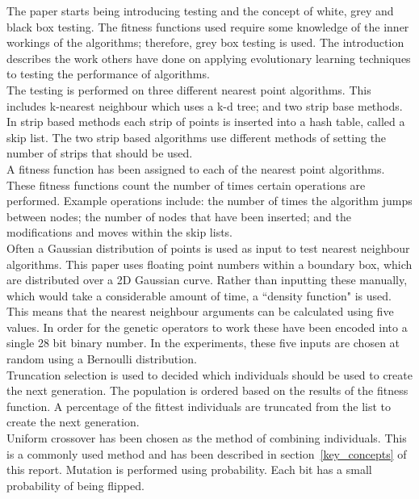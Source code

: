 \documentclass[10pt,a4paper,openbib]{article}
\begin{document}
\begin{multicols}{2}
\noindent The paper starts being introducing testing and the concept of white, grey and black box testing. The fitness functions used require some knowledge of the inner workings of the algorithms; therefore, grey box testing is used. The introduction describes the work others have done on applying evolutionary learning techniques to testing the performance of algorithms.\\

\noindent The testing is performed on three different nearest point algorithms. This includes k-nearest neighbour which uses a k-d tree; and two strip base methods. In strip based methods each strip of points is inserted into a hash table, called a skip list. The two strip based algorithms use different methods of setting the number of strips that should be used. \\

\noindent A fitness function has been assigned to each of the nearest point algorithms. These fitness functions count the number of times certain operations are performed. Example operations include: the number of times the algorithm jumps between nodes; the number of nodes that have been inserted; and the modifications and moves within the skip lists. \\

\noindent Often a Gaussian distribution of points is used as input to test nearest neighbour algorithms. This paper uses floating point numbers within a boundary box, which are distributed over a 2D Gaussian curve. Rather than inputting these manually, which would take a considerable amount of time, a ``density function" is used. This means that the nearest neighbour arguments can be calculated using five values. In order for the genetic operators to work these have been encoded into a single 28 bit binary number. In the experiments, these five inputs are chosen at random using a Bernoulli distribution. \cite{BernoulliDistribution}\\

\noindent Truncation selection is used to decided which individuals should be used to create the next generation. The population is ordered based on the results of the fitness function. A percentage of the fittest individuals are truncated from the list to create the next generation. \cite{selectionMethods}\\

\noindent Uniform crossover has been chosen as the method of combining individuals. This is a commonly used method and has been described in section~\ref{key_concepts} of this report. Mutation is performed using probability. Each bit has a small probability of being flipped.\\


\end{multicols}
\end{document}
